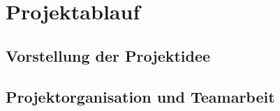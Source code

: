 \section{Projektablauf}\label{Projektablauf}

\subsection{Vorstellung der Projektidee}

\subsection{Projektorganisation und Teamarbeit}

